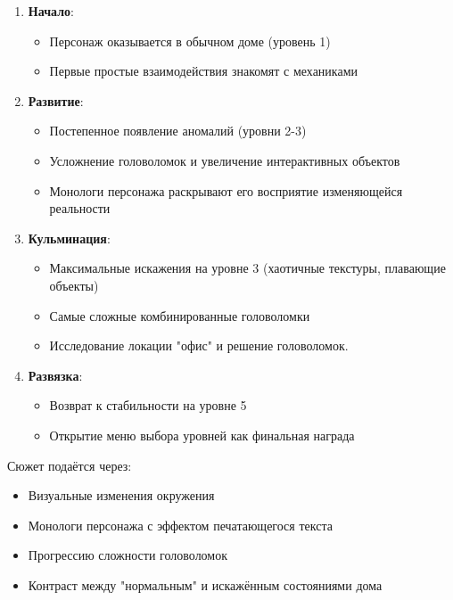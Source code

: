 \documentclass{article}
\begin{document}
\begin{enumerate}
    \item \textbf{Начало}:
    \begin{itemize}
        \item Персонаж оказывается в обычном доме (уровень 1)
        \item Первые простые взаимодействия знакомят с механиками
    \end{itemize}
    
    \item \textbf{Развитие}:
    \begin{itemize}
        \item Постепенное появление аномалий (уровни 2-3)
        \item Усложнение головоломок и увеличение интерактивных объектов
        \item Монологи персонажа раскрывают его восприятие изменяющейся реальности
    \end{itemize}
    
    \item \textbf{Кульминация}:
    \begin{itemize}
        \item Максимальные искажения на уровне 3 (хаотичные текстуры, плавающие объекты)
        \item Самые сложные комбинированные головоломки
        \item Исследование локации "офис" и решение головоломок.
    \end{itemize}
    
    \item \textbf{Развязка}:
    \begin{itemize}
        \item Возврат к стабильности на уровне 5
        \item Открытие меню выбора уровней как финальная награда
    \end{itemize}
\end{enumerate}

Сюжет подаётся через:
\begin{itemize}
    \item Визуальные изменения окружения
    \item Монологи персонажа с эффектом печатающегося текста
    \item Прогрессию сложности головоломок
    \item Контраст между "нормальным" и искажённым состояниями дома
\end{itemize}
\end{document}
